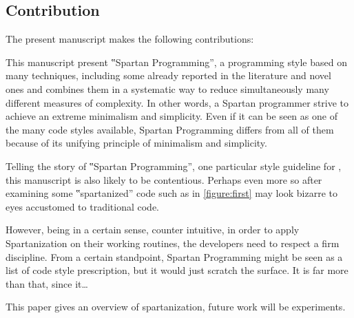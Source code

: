 \subsection{Contribution}

The present manuscript makes the following contributions:

This manuscript present ‟Spartan Programming”, a programming style based on
many techniques, including some already reported in the literature and novel
ones and combines them in a systematic way to reduce simultaneously many
different measures of complexity.  In other words, a Spartan programmer strive
to achieve an extreme minimalism and simplicity.  Even if it can be seen as one
of the many code styles available, Spartan Programming differs from all of them
because of its unifying principle of minimalism and simplicity.

Telling the story of ‟Spartan Programming”, one particular style guideline for
\Java, this manuscript is also likely to be contentious. Perhaps even more so
after examining some ‟spartanized” code such as in \cref{figure:first}
may look bizarre to eyes accustomed to traditional \Java code.


However, being in a certain sense, counter intuitive, in order to apply
Spartanization on their working routines, the developers need to respect a
firm discipline. From a certain standpoint, Spartan Programming might be
seen as a list of code style prescription, but it would just scratch the
surface. It is far more than that, since it…  

This paper gives an overview of spartanization, future work will be
experiments.
